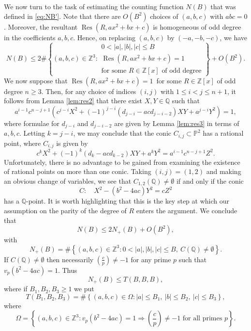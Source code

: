 \documentclass[reqno, 12pt, twoside]{amsart}
\numberwithin{equation}{section}
\DeclareMathOperator{\Res}{Res}
\newcommand{\PP}{\mathbb{P}}
\newcommand{\ZZ}{\mathbb{Z}}
\newcommand{\QQ}{\mathbb{Q}}
\newcommand{\0}{\mathbf{0}}
\theoremstyle{definition}
\renewcommand{\leq}{\leqslant}
\renewcommand{\geq}{\geqslant}
\begin{document}
We 
now  turn to the task of estimating the counting function $N(B)$ that was defined in 
\eqref{eq:NB'}. 
Note that there are $O(B^2)$ choices  of $(a,b,c)$ with $abc= 0$.
Moreover, the resultant $\Res(R,ax^2+bx+c)$ is homogeneous of odd degree 
in the coefficients $a,b,c$. Hence, on replacing $(a,b,c)$ by $(-a,-b,-c)$, we have 
$$
N(B)\leq 
2\#\left\{(a,b,c)\in \ZZ^3: 
\begin{array}{l}
0<|a|,|b|,|c|\leq B\\
\Res(R,ax^2+bx+c)=1\\ 
\text{for some $R\in \ZZ[x]$ of odd degree}
\end{array}
\right\}
+O(B^2).
$$
We now suppose that 
$\Res(R,ax^2+bx+c)=1$\ 
for some $R\in \ZZ[x]$ of odd degree $n\geq 3$.
Then, for any choice of indices $(i,j)$  with $1\leq i<j\leq n+1$, it follows from Lemma \ref{lem:res2} that 
there exist $X,Y\in \QQ$ such that 
$$
a^{i-1}c^{n-j+1}\left(c^{j-i}X^2+(-1)^{j-i}(d_{j-i}-acd_{j-i-2})XY+a^{j-i}Y^2\right)= 1, 
$$
where formulae for $d_{j-i}$ and $d_{j-i-2}$ are given by Lemma \ref{lem:res3} in 
 terms of $a,b,c$.
 Letting $k=j-i$, we may conclude that the conic $C_{i,j}\subset \PP^2$ 
has a rational point, where $C_{i,j}$ is given by 
$$
c^{k}X^2+(-1)^{k}(d_{k}-acd_{k-2})XY+a^{k}Y^2= a^{i-1}c^{n-j+1}Z^2.
$$
Unfortunately, there is no advantage to be gained from 
examining the existence of rational points on more than  one conic.
 Taking $(i,j)=(1,2)$ and making an obvious change of variables, we see that $C_{1,2}(\QQ)\neq \emptyset$ if and only if 
the conic 
$$
C: \quad X^2-(b^2-4ac)Y^2=cZ^2
$$
has a $\QQ$-point.  It is worth highlighting that this is the key step at which our assumption on the parity of the degree of $R$  enters the argument.  We conclude that 
\begin{equation}\label{eq:comic}
N(B)\leq 2N_+(B)+O(B^2),
\end{equation}
with 
$$
N_+(B)=
\#\left\{(a,b,c)\in \ZZ^3: 
0<|a|,|b|,|c|\leq B,~
C(\QQ)\neq \emptyset 
\right\}.
$$
If $C(\QQ)\neq \emptyset$  then necessarily 
$(\frac{c}{p})\neq -1$
for any prime $p$ such that $v_p(b^2-4ac)=1$. 
Thus
\begin{equation}\label{eq:book}
N_+(B)\leq 
T(B,B,B),
\end{equation}
where 
if $B_1,B_2,B_3\geq 1$ we put 
$$
T(B_1,B_2,B_3)=
\#\left\{(a,b,c)\in \Omega: 
|a|\leq B_1,~|b|\leq B_2,~|c|\leq B_3
\right\},
$$
 where
$$
\Omega=
\left\{(a,b,c)\in \ZZ^3:
v_p(b^2-4ac)=1\Rightarrow \left(\frac{c}{p}\right)\neq -1
\text{ for all primes $p$}\right\}.
$$
\end{document}
